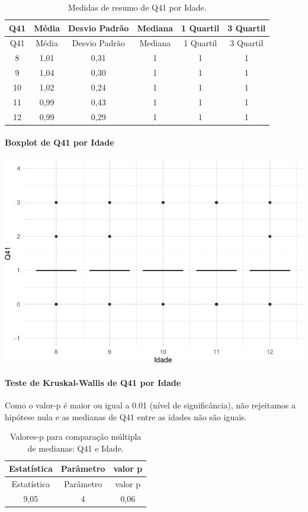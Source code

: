 \documentclass[]{article}
\let\oldparagraph\paragraph
\renewcommand{\paragraph}[1]{\oldparagraph{#1}\mbox{}}
\begin{document}
\begin{longtable}[]{@{}cccccc@{}}
\caption{\label{tab:unnamed-chunk-1629}Medidas de resumo de Q41 por Idade.}\tabularnewline
\toprule
Q41 & Média & Desvio Padrão & Mediana & 1 Quartil & 3 Quartil\tabularnewline
\midrule
\endfirsthead
\toprule
Q41 & Média & Desvio Padrão & Mediana & 1 Quartil & 3 Quartil\tabularnewline
\midrule
\endhead
8 & 1,01 & 0,31 & 1 & 1 & 1\tabularnewline
9 & 1,04 & 0,30 & 1 & 1 & 1\tabularnewline
10 & 1,02 & 0,24 & 1 & 1 & 1\tabularnewline
11 & 0,99 & 0,43 & 1 & 1 & 1\tabularnewline
12 & 0,99 & 0,29 & 1 & 1 & 1\tabularnewline
\bottomrule
\end{longtable}

\hypertarget{boxplot-de-q41-por-idade}{%
\paragraph{Boxplot de Q41 por Idade}\label{boxplot-de-q41-por-idade}}

\begin{center}\includegraphics[width=0.75\linewidth]{relatorio_covid19_files/figure-latex/unnamed-chunk-1630-1} \end{center}

\hypertarget{teste-de-kruskal-wallis-de-q41-por-idade}{%
\paragraph{Teste de Kruskal-Wallis de Q41 por Idade}\label{teste-de-kruskal-wallis-de-q41-por-idade}}

Como o valor-p é maior ou igual a 0.01 (nível de significância), não rejeitamos a hipótese nula e as medianas de Q41 entre as idades não são iguais.

\begin{longtable}[]{@{}ccc@{}}
\caption{\label{tab:unnamed-chunk-1632}Valores-p para comparação múltipla de medianas: Q41 e Idade.}\tabularnewline
\toprule
Estatística & Parâmetro & valor p\tabularnewline
\midrule
\endfirsthead
\toprule
Estatística & Parâmetro & valor p\tabularnewline
\midrule
\endhead
9,05 & 4 & 0,06\tabularnewline
\bottomrule
\end{longtable}
\end{document}
